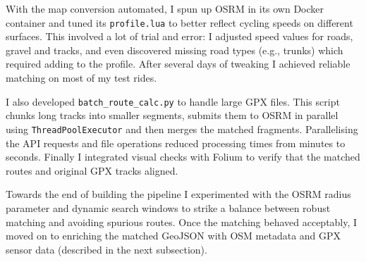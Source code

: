 \documentclass[11pt,twoside]{report}
\begin{document}
With the map conversion automated, I spun up OSRM in its own Docker container and tuned its \texttt{profile.lua} to better reflect cycling speeds on different surfaces. This involved a lot of trial and error: I adjusted speed values for roads, gravel and tracks, and even discovered missing road types (e.g., trunks) which required adding to the profile. After several days of tweaking I achieved reliable matching on most of my test rides.

I also developed \texttt{batch\_route\_calc.py} to handle large GPX files. This script chunks long tracks into smaller segments, submits them to OSRM in parallel using \texttt{ThreadPoolExecutor} and then merges the matched fragments. Parallelising the API requests and file operations reduced processing times from minutes to seconds. Finally I integrated visual checks with Folium \citep{folium} to verify that the matched routes and original GPX tracks aligned.

Towards the end of building the pipeline I experimented with the OSRM radius parameter and dynamic search windows to strike a balance between robust matching and avoiding spurious routes. Once the matching behaved acceptably, I moved on to enriching the matched GeoJSON with OSM metadata and GPX sensor data (described in the next subsection).

\end{document}
